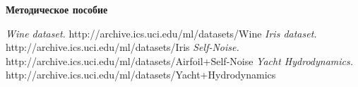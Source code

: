 \documentclass[12pt, twoside]{article}
\begin{document}
\begin{center}
{\LARGE \bf Методическое пособие}\\
\end{center}



















\begin{thebibliography}{99}
	\textit{Wine dataset.} http://archive.ics.uci.edu/ml/datasets/Wine
	\textit{Iris dataset.} http://archive.ics.uci.edu/ml/datasets/Iris
	\textit{Self-Noise.} http://archive.ics.uci.edu/ml/datasets/Airfoil+Self-Noise
	\textit{Yacht Hydrodynamics.} http://archive.ics.uci.edu/ml/datasets/Yacht+Hydrodynamics
\end{thebibliography}
\end{document}
